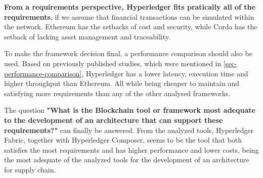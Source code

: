 \textbf{From a requirements perspective, Hyperledger fits pratically all of the requirements}, if we assume that financial transactions can be simulated within the network. Ethereum has the setbacks of cost and security, while Corda has the setback of lacking asset management and traceability.


To make the framework decision final, a performance comparison should also be used.  Based on previously published studies, which were mentioned in \ref{sec-performance-comparison}, Hyperledger has a lower latency, execution time and higher throughput than Ethereum. All while being cheaper to maintain and satisfying more requirements than any of the other analysed frameworks.

\par The question \textbf{"What is the Blockchain tool or framework most adequate to the development of an architecture that can support these requirements?"} can finally be answered. From the analyzed tools, Hyperledger Fabric, together with Hyperledger Composer, seems to be the tool that both satisfies the most requirements and has higher performance and lower costs, being the most adequate of the analyzed tools for the development of an architecture for supply chain.





